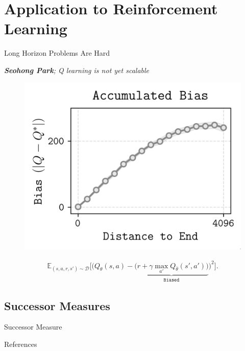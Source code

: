 \documentclass{beamer}
\begin{document}
\section{Application to Reinforcement Learning}
\begin{frame}{Long Horizon Problems Are Hard}
    \begin{block}{\cite{parkQlearningNotScalable2025}}
        \centering
        \vspace*{-1cm}
        \emph{\textbf{Seohong Park}; Q learning is not yet scalable}
    \end{block}
    \begin{figure}
        \includegraphics[width=0.5\linewidth]{figures/bias_accumulation.png}
    \end{figure}
    \begin{align*}
\mathbb{E}_{(s,a,r,s')\sim \mathcal{D}}\bigg[\Big(Q_\theta(s,a)-\underbrace{\big(r+\gamma \max_{a'}Q_{\bar{\theta}}(s',a')\big)}_{\texttt{Biased}}\Big)^2\bigg]
    .\end{align*}
\end{frame}
\subsection{Successor Measures}
\begin{frame}{Successor Measure}
    
\end{frame}


\begin{frame}{References}
    
    
\end{frame}
\end{document}
